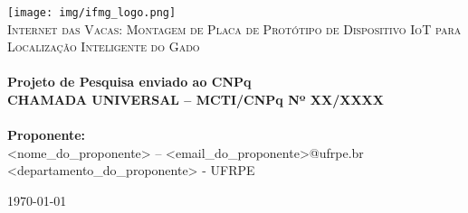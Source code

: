 \begin{titlepage}
\begin{center}

\texttt{[image: img/ifmg\_logo.png]}~\\[1cm]

\textsc{\Large Internet das Vacas: Montagem de Placa de Protótipo de
Dispositivo IoT para Localização Inteligente do Gado}\\[3cm]


\HRule \\[0.4cm]
{\large \bfseries Projeto de Pesquisa enviado ao CNPq \\
CHAMADA UNIVERSAL – MCTI/CNPq Nº XX/XXXX \\[0.4cm]}
\HRule \\[4cm]

\large\textbf{Proponente:}\\
<nome\_do\_proponente> – <email\_do\_proponente>@ufrpe.br\\
<departamento\_do\_proponente> - UFRPE\\[3cm]

\vfill

{\large \today}

\end{center}
\end{titlepage}